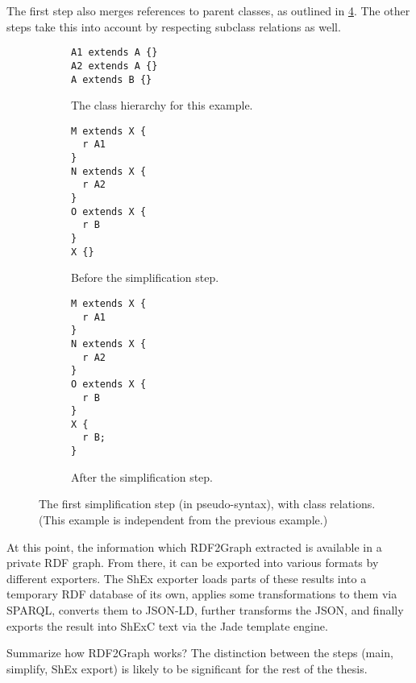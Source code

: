 The first step also merges references to parent classes,
as outlined in \cref{fig:simplify-7.4.2-classes}.
The other steps take this into account by respecting subclass relations as well.

\begin{figure}[h]
  \begin{subfigure}[t]{0.3\textwidth}
    \begin{lstlisting}
A1 extends A {}
A2 extends A {}
A extends B {}
    \end{lstlisting}
    \caption{The class hierarchy for this example.}
    \label{fig:simplify-7.4.2-classes-hierarchy}
  \end{subfigure}
  \begin{subfigure}[t]{0.3\textwidth}
    \begin{lstlisting}
M extends X {
  r A1
}
N extends X {
  r A2
}
O extends X {
  r B
}
X {}
    \end{lstlisting}
    \caption{Before the simplification step.}
    \label{fig:simplify-7.4.2-classes-before}
  \end{subfigure}
  \begin{subfigure}[t]{0.3\textwidth}
    \begin{lstlisting}
M extends X {
  r A1
}
N extends X {
  r A2
}
O extends X {
  r B
}
X {
  r B;
}
    \end{lstlisting}
    \caption{After the simplification step.}
    \label{fig:simplify-7.4.2-classes-after}
  \end{subfigure}
  \caption{
    The first simplification step (in pseudo-syntax), with class relations.
    (This example is independent from the previous example.)
  }
  \label{fig:simplify-7.4.2-classes}
\end{figure}

At this point, the information which RDF2Graph extracted is available in a private RDF graph.
From there, it can be exported into various formats by different exporters.
The ShEx exporter loads parts of these results into a temporary RDF database of its own,
applies some transformations to them via SPARQL,
converts them to JSON-LD,
further transforms the JSON,
and finally exports the result into ShExC text via the Jade template engine.


Summarize how RDF2Graph works?
The distinction between the steps
(main, simplify, ShEx export)
is likely to be significant for the rest of the thesis.
